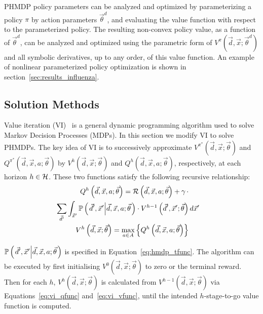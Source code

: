 PHMDP policy parameters can be analyzed and optimized by parameterizing a policy {\footnotesize $\pi$} by action parameters {\footnotesize $\vec{\theta}^{d}$}, and evaluating the value function with respect to the parameterized policy. The resulting non-convex policy value, as a function of {\footnotesize $\vec{\theta}^{d}$}, can be analyzed and optimized using the parametric form of {\footnotesize $V^{\pi}(\vec{d}, \vec{x}; \vec{\theta}^{d})$} and all symbolic derivatives, up to any order, of this value function. An example of nonlinear parameterized policy optimization is shown in section~\ref{sec:results_influenza}. 

\subsection{Solution Methods}

Value iteration (VI)~\parencite{Bellman_PU_1957} is a general dynamic programming algorithm used to solve Markov Decision Processes (MDPs). In this section we modify VI to solve PHMDPs. The key idea of VI is to successively approximate {\footnotesize $V^{\pi^{*}}(\vec{d}, \vec{x}; \vec{\theta})$} and {\footnotesize $Q^{\pi^{*}}(\vec{d}, \vec{x}, a; \vec{\theta})$} by {\footnotesize $V^{h}(\vec{d}, \vec{x}; \vec{\theta})$} and
{\footnotesize $Q^{h}(\vec{d}, \vec{x}, a; \vec{\theta})$}, respectively, at each horizon {\footnotesize$h \in \mathcal{H}$}. These two functions satisfy the following recursive relationship:
{\footnotesize 
    \abovedisplayskip=0pt
    \belowdisplayskip=0pt
    \begin{align}
        Q^{h} \left( \vec{d}, \vec{x}, a; \vec{\theta} \right) = \mathcal{R} \left( \vec{d}, \vec{x}, a; \vec{\theta} \right) + \gamma \, \cdot &  \nonumber \\ 
        \sum_{\vec{d}'} \int_{\vec{x}'} \mathbb{P}\left({\left. \vec{d}', \vec{x}' \middle| \vec{d}, \vec{x}, a; \vec{\theta} \right.}\right) \cdot V^{h-1}\left( \vec{d}', \vec{x}'; \vec{\theta} \right) & \, d\vec{x}'  \label{eq:vi_qfunc} \quad \\
        V^{h}\left( \vec{d}, \vec{x}; \vec{\theta} \right) = \max_{a \in A} \left\{ Q^{h}\left( \vec{d}, \vec{x}, a; \vec{\theta} \right) \right\} & \label{eq:vi_vfunc}
    \end{align}
}%

{\footnotesize $\mathbb{P}\left({\left. \vec{d}', \vec{x}' \middle| \vec{d}, \vec{x}, a; \vec{\theta} \right. }\right)$ } is specified in Equation~\eqref{eq:hmdp_tfunc}. The algorithm can be executed by first initialising {\footnotesize   $V^{0}(\vec{d}, \vec{x}; \vec{\theta})$} to zero or the terminal reward. Then for each {\footnotesize$h$}, {\footnotesize $V^{h}(\vec{d}, \vec{x}; \vec{\theta})$} is calculated from {\footnotesize $V^{h-1}(\vec{d}, \vec{x}; \vec{\theta})$} via Equations~\eqref{eq:vi_qfunc} and~\eqref{eq:vi_vfunc}, until the intended $h$-stage-to-go value function is computed.

